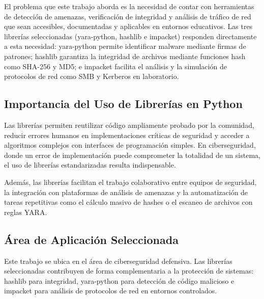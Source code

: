 \documentclass[12pt,a4paper]{article}
\begin{document}
El problema que este trabajo aborda es la necesidad de contar con
herramientas de detección de amenazas, verificación de integridad y
análisis de tráfico de red que sean accesibles, documentadas y
aplicables en entornos educativos. Las tres librerías seleccionadas
(yara-python, hashlib e impacket) responden directamente a esta
necesidad: yara-python permite identificar malware mediante firmas de
patrones; hashlib garantiza la integridad de archivos mediante funciones
hash como SHA-256 y MD5; e impacket facilita el análisis y la simulación
de protocolos de red como SMB y Kerberos en laboratorio.

\subsection{Importancia del Uso de Librerías en Python}

Las librerías permiten reutilizar código ampliamente probado por la
comunidad, reducir errores humanos en implementaciones críticas de
seguridad y acceder a algoritmos complejos con interfaces de
programación simples. En ciberseguridad, donde un error de
implementación puede comprometer la totalidad de un sistema, el uso de
librerías estandarizadas resulta indispensable.

Además, las librerías facilitan el trabajo colaborativo entre equipos de
seguridad, la integración con plataformas de análisis de amenazas y la
automatización de tareas repetitivas como el cálculo masivo de hashes o
el escaneo de archivos con reglas YARA.

\subsection{Área de Aplicación Seleccionada}

Este trabajo se ubica en el área de ciberseguridad defensiva. Las
librerías seleccionadas contribuyen de forma complementaria a la
protección de sistemas: hashlib para integridad, yara-python para
detección de código malicioso e impacket para análisis de protocolos de
red en entornos controlados.
\end{document}
